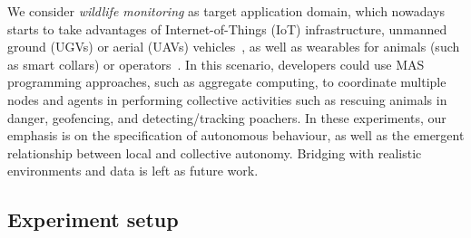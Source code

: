 We consider \emph{wildlife monitoring} as target application domain, which nowadays
 starts to take advantages of Internet-of-Things (IoT) infrastructure, 
 unmanned ground (UGVs) or aerial (UAVs) vehicles~\cite{DBLP:journals/sensors/GonzalezMPJMG16}, as well as 
 wearables for animals (such as smart collars) or operators~\cite{DBLP:conf/ntms/AyeleMH18a}. 
%
In this scenario, developers could 
 use MAS programming approaches,
 such as aggregate computing,
 to coordinate multiple nodes and agents
 in performing collective activities 
 such as rescuing animals in danger, 
 geofencing, 
 and 
 detecting/tracking poachers. 
%
In these experiments, our emphasis is
 on the specification of autonomous behaviour,
 as well as the emergent relationship between 
 local and collective autonomy.
%
Bridging with realistic environments and data is left as future work.

\subsection{Experiment setup} \label{sb:experiment-setup}

